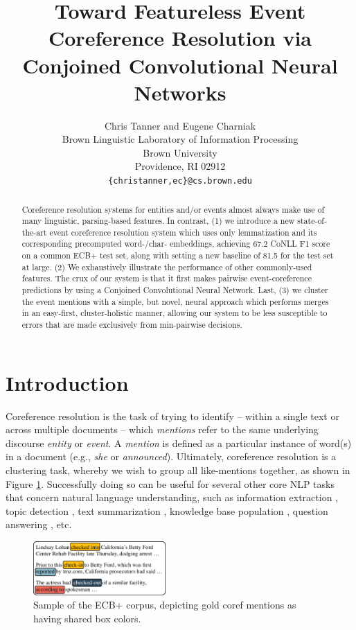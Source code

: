 \documentclass[11pt,a4paper]{article}
\title{Toward Featureless Event Coreference Resolution via Conjoined Convolutional Neural Networks}
\author{Chris Tanner \textnormal{and} Eugene Charniak\\
Brown Linguistic Laboratory of Information Processing \\
  Brown University \\
  Providence, RI  02912 \\
  {\tt \{christanner,ec\}@cs.brown.edu} \\}
\date{}
\begin{document}
\maketitle
\begin{abstract}
Coreference resolution systems for entities and/or events almost always make use of many linguistic, parsing-based features.  In contrast, (1) we introduce a new state-of-the-art event coreference resolution system which uses only lemmatization and its corresponding precomputed word-/char- embeddings, achieving 67.2 CoNLL F1 score on a common ECB+ test set, along with setting a new baseline of 81.5 for the test set at large. (2) We exhaustively illustrate the performance of other commonly-used features.  The crux of our system is that it first makes pairwise event-coreference predictions by using a Conjoined Convolutional Neural Network.  Last, (3) we cluster the event mentions with a simple, but novel, neural approach which performs merges in an easy-first, cluster-holistic manner, allowing our system to be less susceptible to errors that are made exclusively from min-pairwise decisions.
\end{abstract}

\section{Introduction}
Coreference resolution is the task of trying to identify -- within a single text or across multiple documents -- which \textit{mentions} refer to the same underlying discourse \textit{entity} or \textit{event}.  A \textit{mention} is defined as a particular instance of word(s) in a document (e.g., \textit{she} or \textit{announced}).  Ultimately, coreference resolution is a clustering task, whereby we wish to group all like-mentions together, as shown in Figure \ref{fig:corpus}.  Successfully doing so can be useful for several other core NLP tasks that concern natural language understanding, such as information extraction \cite{Humphreys:1997}, topic detection \cite{Allan:1998}, text summarization \cite{Daniel:2003}, knowledge base population \cite{Cross_Document_Coreference_Resolution_A_Key_Technology_for_Learning_by_Reading}, question answering \cite{Narayanan:2004:QAB:1220355.1220455}, etc.

\begin{figure}[ht]
\centering
	\includegraphics[width=0.45\textwidth]{corpus}
	\caption{Sample of the ECB+ corpus, depicting gold coref mentions as having shared box colors.}
	\label{fig:corpus}
\end{figure}
\end{document}
